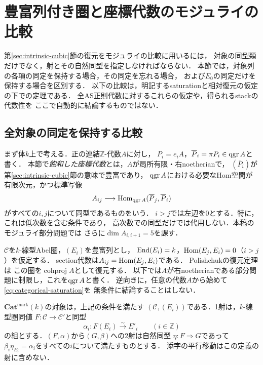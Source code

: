 \section{豊富列付き圏と座標代数のモジュライの比較}
\label{sec:categorical-moduli-comparison}

第\ref{sec:intrinsic-cubic}節の復元をモジュライの比較に用いるには，
対象の同型類だけでなく，射とその自然同型を指定しなければならない．
本節では，対象列の各項の同定を保持する場合，その同定を忘れる場合，
および$E_0$の同定だけを保持する場合を区別する．
以下の比較は，明記するsaturationと相対復元の仮定の下での定理である．
全AS正則代数に対するこれらの仮定や，得られるstackの代数性を
ここで自動的に結論するものではない．

\subsection{全対象の同定を保持する比較}

まず体$k$上で考える．正の連結$\mathbb Z$-代数$A$に対し，
$P_i=e_iA$，$\overline P_i=\pi P_i\in\operatorname{qgr} A$と書く．
本節で\emph{飽和した座標代数}とは，$A$が局所有限・右noetherianで，
$(\overline P_i)$が第\ref{sec:intrinsic-cubic}節の意味で豊富であり，
$\operatorname{qgr} A$における必要なHom空間が有限次元，かつ標準写像
\begin{equation}\label{eq:categorical-saturation}
 A_{ij}\longrightarrow
 \operatorname{Hom}_{\operatorname{qgr} A}(\overline P_j,\overline P_i)
\end{equation}
がすべての$i,j$について同型であるものをいう．
$i>j$では左辺を$0$とする．特に，これは低次数を含む条件であり，
高次数での同型だけでは代用しない．本稿のモジュライ部分問題では
さらに$\dim A_{i,i+1}=5$を課す．

$\mathcal C$を$k$-線型Abel圏，$(E_i)$を豊富列とし，
$\operatorname{End}(E_i)=k$，$\operatorname{Hom}(E_j,E_i)=0$（$i>j$）を仮定する．
section代数は$A_{ij}=\operatorname{Hom}(E_j,E_i)$である．
Polishchukの復元定理\cite[Theorem~2.4]{PolishchukProj}は
この圏を$\operatorname{cohproj}A$として復元する．
以下では$A$が右noetherianである部分問題に制限し，これを$\operatorname{qgr} A$と書く．
逆向きに，任意の代数$A$から始めて\eqref{eq:categorical-saturation}を
無条件に結論することはしない．

\begin{definition}
\label{def:categorical-marked}
$\mathbf{Cat}^{\mathrm{mark}}(k)$の対象は，上記の条件を満たす
$(\mathcal C,(E_i))$である．1射は，$k$-線型圏同値
$F:\mathcal C\to\mathcal C'$と同型
\[
 \alpha_i:F(E_i)\xrightarrow{\sim}E'_i\qquad(i\in\mathbb Z)
\]
の組とする．$(F,\alpha)$から$(G,\beta)$への2射は自然同型
$\eta:F\Rightarrow G$であって
$\beta_i\eta_{E_i}=\alpha_i$をすべての$i$について満たすものとする．
添字の平行移動はこの定義の射に含めない．
\end{definition}

